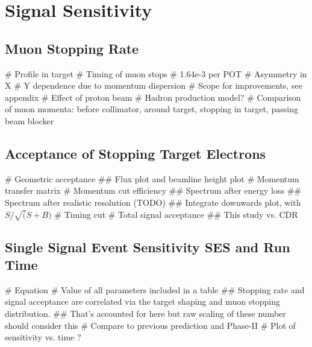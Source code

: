 
\chapter{\phaseII Signal Sensitivity}
\section{Muon Stopping Rate}
\begin{easylist}
# Profile in target
# Timing of muon stops
# 1.64e-3 per POT
# Asymmetry in X
# Y dependence due to momentum dispersion
# Scope for improvements, see appendix
# Effect of proton beam
# Hadron production model?
# Comparison of muon momenta: before collimator, around target, stopping in target, passing beam blocker
\end{easylist}

\section{Acceptance of Stopping Target Electrons}
\FigSensMomTransfer
\FigSensMomSpectra
\FigSensMomIntegral
\FigSensTiming
\begin{easylist}
# Geometric acceptance
## Flux plot and beamline height plot
# Momentum transfer matrix
# Momentum cut efficiency
## Spectrum after energy loss
## Spectrum after realistic resolution (TODO)
## Integrate downwards plot, with $S/\sqrt(S+B)$
# Timing cut
# Total signal acceptance
## This study vs. CDR
\end{easylist}

\section{Single Signal Event Sensitivity \acs{SES} and Run Time}
\begin{easylist}
# Equation
# Value of all parameters included in a table
## Stopping rate and signal acceptance are correlated via the target shaping and muon stopping distribution.
## That's accounted for here but raw scaling of these number should consider this
# Compare to previous prediction and Phase-II
# Plot of sensitivity vs. time ?
\end{easylist}
